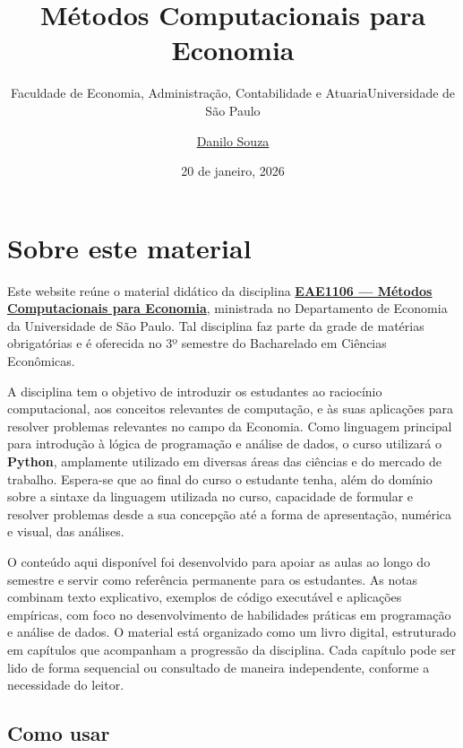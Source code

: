 \documentclass[
  brazilian,
  letterpaper,
  DIV=11,
  numbers=noendperiod]{scrreprt}
\title{Métodos Computacionais para Economia}
\subtitle{Faculdade de Economia, Administração, Contabilidade e
AtuariaUniversidade de São Paulo}
\author{\href{https://www.danilosouza.com/}{Danilo Souza}}
\date{20 de janeiro, 2026}
\renewcommand*\contentsname{Índice}
\newcommand\contentsname{Índice}
\begin{document}
\maketitle

\renewcommand*\contentsname{Índice}
{
\hypersetup{linkcolor=}
\setcounter{tocdepth}{2}
\tableofcontents
}


\chapter*{Sobre este material}\label{sobre-este-material}


Este website reúne o material didático da disciplina
\href{https://uspdigital.usp.br/jupiterweb/obterDisciplina?nomdis=&sgldis=eae1106}{\textbf{EAE1106
--- Métodos Computacionais para Economia}}, ministrada no Departamento
de Economia da Universidade de São Paulo. Tal disciplina faz parte da
grade de matérias obrigatórias e é oferecida no 3º semestre do
Bacharelado em Ciências Econômicas.

A disciplina tem o objetivo de introduzir os estudantes ao raciocínio
computacional, aos conceitos relevantes de computação, e às suas
aplicações para resolver problemas relevantes no campo da Economia. Como
linguagem principal para introdução à lógica de programação e análise de
dados, o curso utilizará o \textbf{Python}, amplamente utilizado em
diversas áreas das ciências e do mercado de trabalho. Espera-se que ao
final do curso o estudante tenha, além do domínio sobre a sintaxe da
linguagem utilizada no curso, capacidade de formular e resolver
problemas desde a sua concepção até a forma de apresentação, numérica e
visual, das análises.

O conteúdo aqui disponível foi desenvolvido para apoiar as aulas ao
longo do semestre e servir como referência permanente para os
estudantes. As notas combinam texto explicativo, exemplos de código
executável e aplicações empíricas, com foco no desenvolvimento de
habilidades práticas em programação e análise de dados. O material está
organizado como um livro digital, estruturado em capítulos que
acompanham a progressão da disciplina. Cada capítulo pode ser lido de
forma sequencial ou consultado de maneira independente, conforme a
necessidade do leitor.

\section*{Como usar}\label{como-usar}
\end{document}
